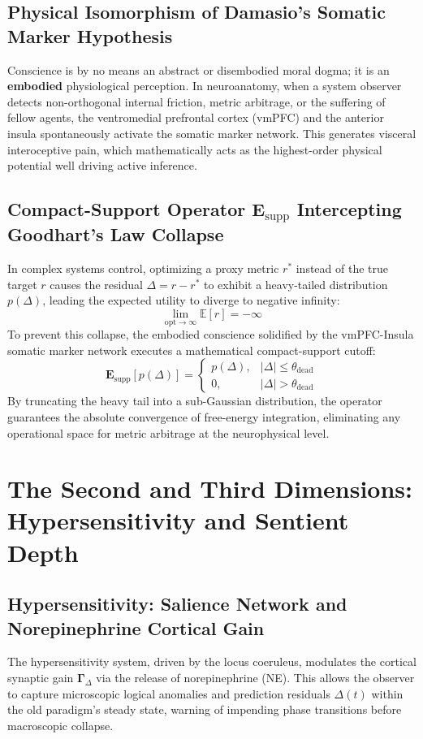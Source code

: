 \documentclass[11pt,a4paper]{article}
\begin{document}
\subsection{Physical Isomorphism of Damasio's Somatic Marker Hypothesis}
Conscience is by no means an abstract or disembodied moral dogma; it is an \textbf{embodied} physiological perception. In neuroanatomy, when a system observer detects non-orthogonal internal friction, metric arbitrage, or the suffering of fellow agents, the ventromedial prefrontal cortex (vmPFC) and the anterior insula spontaneously activate the somatic marker network. This generates visceral interoceptive pain, which mathematically acts as the highest-order physical potential well driving active inference.

\subsection{Compact-Support Operator $\mathbf{E}_{\text{supp}}$ Intercepting Goodhart's Law Collapse}
In complex systems control, optimizing a proxy metric $r^*$ instead of the true target $r$ causes the residual $\Delta = r - r^*$ to exhibit a heavy-tailed distribution $p(\Delta)$, leading the expected utility to diverge to negative infinity:
\begin{equation}
\lim_{\text{opt} \to \infty} \mathbb{E}[r] = -\infty
\end{equation}
To prevent this collapse, the embodied conscience solidified by the vmPFC-Insula somatic marker network executes a mathematical compact-support cutoff:
\begin{equation}
\mathbf{E}_{\text{supp}}[p(\Delta)] = \begin{cases} p(\Delta), & |\Delta| \le \theta_{\text{dead}} \\ 0, & |\Delta| > \theta_{\text{dead}} \end{cases}
\end{equation}
By truncating the heavy tail into a sub-Gaussian distribution, the operator guarantees the absolute convergence of free-energy integration, eliminating any operational space for metric arbitrage at the neurophysical level.

\section{The Second and Third Dimensions: Hypersensitivity and Sentient Depth}

\subsection{Hypersensitivity: Salience Network and Norepinephrine Cortical Gain}
The hypersensitivity system, driven by the locus coeruleus, modulates the cortical synaptic gain $\mathbf{\Gamma}_{\Delta}$ via the release of norepinephrine (NE). This allows the observer to capture microscopic logical anomalies and prediction residuals $\Delta(t)$ within the old paradigm's steady state, warning of impending phase transitions before macroscopic collapse.
\end{document}
